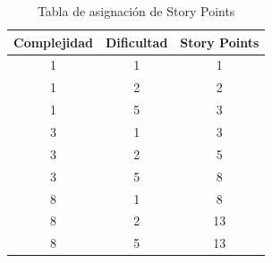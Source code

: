 \documentclass[
11pt, %
codirector, %
]{charter}
\begin{document}
\begin{table}[ht]
\centering
\caption{Tabla de asignación de Story Points}
\label{tab:story-points}
\begin{tabular}{|c|c|c|}
\hline
\textbf{Complejidad} & \textbf{Dificultad} & \textbf{Story Points} \\ \hline
1                    & 1                   & 1                     \\ \hline
1                    & 2                   & 2                     \\ \hline
1                    & 5                   & 3                     \\ \hline
3                    & 1                   & 3                     \\ \hline
3                    & 2                   & 5                     \\ \hline
3                    & 5                   & 8                     \\ \hline
8                    & 1                   & 8                     \\ \hline
8                    & 2                   & 13                    \\ \hline
8                    & 5                   & 13                    \\ \hline
\end{tabular}
\end{table}
\end{document}
